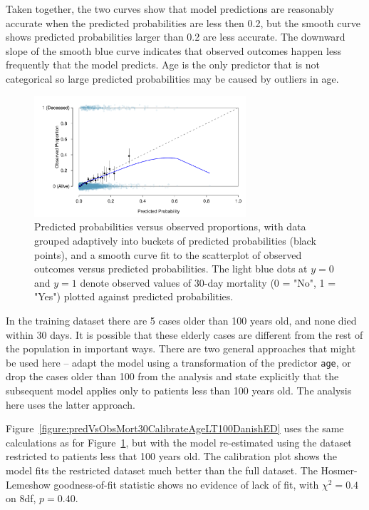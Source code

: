 Taken together, the two curves show that model predictions are reasonably accurate when the predicted probabilities are less then 0.2, but the smooth curve shows predicted probabilities larger than 0.2 are less accurate. The downward slope of the smooth blue curve indicates that observed outcomes happen less frequently that the model predicts.   Age is the only predictor that is not categorical so large predicted probabilities may be caused by outliers in age.

\begin{figure}[!tbh]
  \centering
  \includegraphics[width=0.70\textwidth]
  {ch_logistic_regression_oi_biostat/figures/predVsObsMort30CalibrateDanishED/predVsObsMort30CalibrateDanishED.pdf}
    \caption{Predicted probabilities versus observed proportions, with data grouped adaptively into buckets of predicted probabilities (black points), and a smooth curve fit to the scatterplot of observed outcomes versus predicted probabilities. The light blue dots at  $y = 0$ and $y = 1$ denote observed values of 30-day mortality (0 = "No", 1 = "Yes") plotted against predicted probabilities.}
    \label{figure:predVsObsMort30CalibrateDanishED}
\end{figure}

In the training dataset there are 5 cases older than 100 years old, and none died within 30 days. It is possible that these elderly cases are different from the rest of the population in important ways. There are two general approaches that might be used here -- adapt the model using a transformation of the predictor \texttt{age}, or drop the cases older than 100 from the analysis and state explicitly that the subsequent model applies only to patients less than 100 years old.  The analysis here uses the latter approach.   

Figure~\ref{figure:predVsObsMort30CalibrateAgeLT100DanishED} uses the same calculations as for Figure~\ref{figure:predVsObsMort30CalibrateDanishED}, but with the model re-estimated using the dataset restricted to patients less that 100 years old. The calibration plot shows the model fits the restricted dataset much better than the full dataset.  The Hosmer-Lemeshow goodness-of-fit statistic shows no evidence of lack of fit, with $\chi^2 = 0.4$ on 8df, $p = 0.40$.

